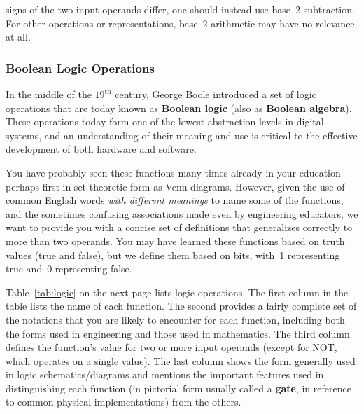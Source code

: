 signs of the two input operands differ, 
one should instead use base~2 subtraction.  For other operations or
representations, base~2 arithmetic may have no relevance at all.\\


\subsubsection{Boolean Logic Operations}

In the middle of the $19^{\mbox{th}}$ century, George Boole introduced a 
set of logic operations that are today known as {\bf Boolean logic}
(also as {\bf Boolean algebra}).  These operations today form one of
the lowest abstraction levels in digital systems, and an understanding
of their meaning and use is critical to the effective development of 
both hardware and software.

You have probably seen these functions many times already in your 
education---perhaps first in set-theoretic form as Venn diagrams.  
However, given the use of common
English words {\em with different meanings} to name some of the functions,
and the sometimes confusing associations made even by engineering
educators, we want to provide you with a concise set of
definitions that generalizes correctly to more than two operands.
You may have learned these functions based on truth values 
(true and false), but we define them based on bits, 
with~1 representing true and~0 representing false.

Table~\ref{tab:logic} on the next page lists logic operations.
%
The first column in the table lists the name of each function.  The second
provides a fairly complete set of the notations that you are likely
to encounter for each function, including both the forms used in
engineering and those used in mathematics.  The third column defines 
the function's
value for two or more input operands (except for NOT, which operates on
a single value).  The last column shows the form generally used in
logic schematics/diagrams and mentions the important features used
in distinguishing each function (in pictorial form usually called
a {\bf gate}, in reference to common physical implementations) from the 
others.

